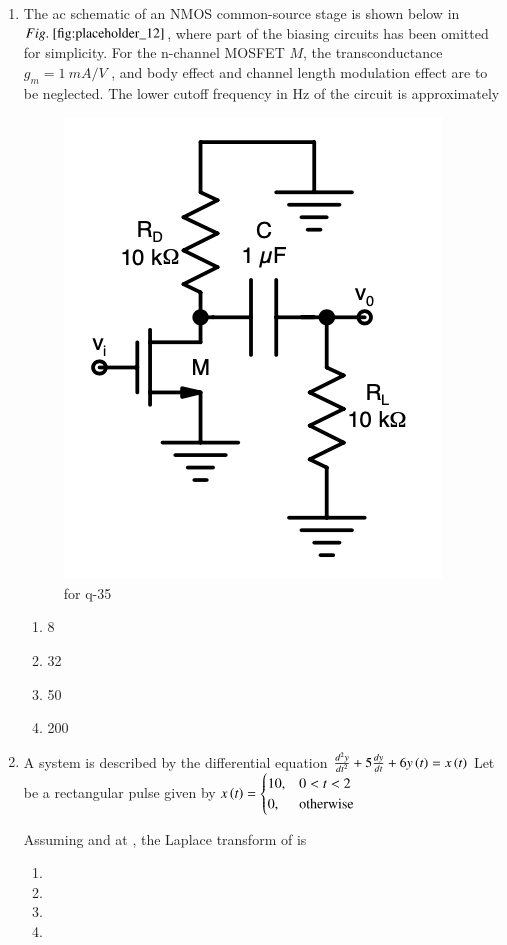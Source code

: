 \documentclass[journal,12pt,onecolumn]{IEEEtran}
\theoremstyle{remark}
\begin{document}
\begin{enumerate}
\item The ac schematic of an NMOS common-source stage is shown below in $\figref{fig:placeholder_12}$, where part of the biasing circuits has been omitted for simplicity. For the n-channel MOSFET $M$, the transconductance $g_m = 1 \ mA/V$ , and body effect and channel length modulation effect are to be neglected. The lower cutoff frequency in Hz of the circuit is approximately
\begin{figure}[H]
    \centering
    \includegraphics[width=0.5\columnwidth]{figs/fig_12.png}
    \caption{for q-35}
    \label{fig:placeholder_12}
\end{figure}
\begin{multicols}{4}
\begin{enumerate}
\item 8
\item 32
\item 50
\item 200
\end{enumerate}
\end{multicols}
\hfill {}



\item A system is described by the differential equation
$\frac{d^2 y}{dt^2} + 5 \frac{dy}{dt} + 6y\left(t\right) = x\left(t\right)$
Let  be a rectangular pulse given by
$
x\left(t\right) = \begin{cases}
10, & 0 < t < 2 \\
0, & \text{otherwise}
\end{cases}
$


Assuming  and  at , the Laplace transform of  is
\begin{multicols}{2}
\begin{enumerate}
\item {}
\item {}
\item {}
\item {}
\end{enumerate}
\end{multicols}
\hfill {}


\end{enumerate}
\end{document}
